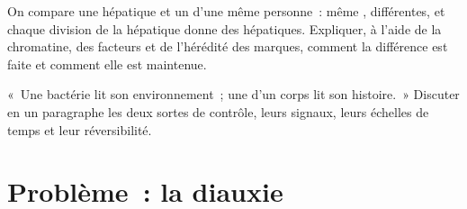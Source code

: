 \begin{exercise}[$\star\star\star$]\label{exo:b1:expression-control:11}
On compare une  hépatique et un  d'une même personne~:
même ,  différentes, et chaque division de la 
hépatique donne des  hépatiques. Expliquer, à l'aide de la
chromatine, des facteurs et de l'hérédité des marques, comment la
différence est faite et comment elle est maintenue.
\end{exercise}

\begin{exercise}[$\star\star\star$]\label{exo:b1:expression-control:12}
«~Une bactérie lit son environnement~; une  d'un corps lit son
histoire.~» Discuter en un paragraphe les deux sortes de contrôle, leurs
signaux, leurs échelles de temps et leur réversibilité.
\end{exercise}

\section{Problème~: la diauxie}

